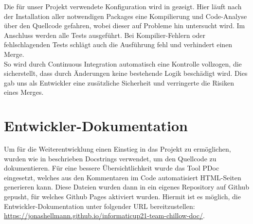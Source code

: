 Die für unser Projekt verwendete Konfiguration wird in  gezeigt.
Hier läuft nach der Installation aller notwendigen Packages eine Kompilierung und Code-Analyse über den
Quellcode gefahren, wobei dieser auf Probleme hin untersucht wird.
Im Anschluss werden alle Tests ausgeführt.
Bei Kompilier-Fehlern oder fehlschlagenden Tests schlägt auch die Ausführung fehl und verhindert einen Merge. \\

So wird durch Continuous Integration automatisch eine Kontrolle vollzogen, die sicherstellt, dass durch Änderungen
keine bestehende Logik beschädigt wird.
Dies gab uns als Entwickler eine zusätzliche Sicherheit und verringerte die Risiken eines Merges.

\section{Entwickler-Dokumentation}
\label{sec:entwickler-doku}

Um für die Weiterentwicklung einen Einstieg in das Projekt zu ermöglichen, wurden wie in
 beschrieben Docstrings verwendet, um den Quellcode zu dokumentieren.
Für eine bessere Übersichtlichkeit wurde das Tool PDoc eingesetzt, welches aus den Kommentaren im Code automatisiert
HTML-Seiten generieren kann. 
Diese Dateien wurden dann in ein eigenes Repository auf Github gepusht, für welches Github Pages 
aktiviert wurden.
Hiermit ist es möglich, die Entwickler-Dokumentation unter folgender URL bereitzustellen:
\url{https://jonashellmann.github.io/informaticup21-team-chillow-doc/}.
